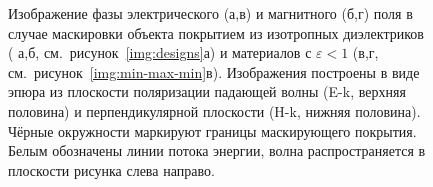\begin{figure}[p]
  \begin{minipage}[ht]{0.495\linewidth}
  \end{minipage}
  \hfill
  \begin{minipage}[ht]{0.495\linewidth}
  \end{minipage}
  \begin{minipage}[ht]{0.495\linewidth}
  \end{minipage}
  \hfill
  \begin{minipage}[ht]{0.495\linewidth}
  \end{minipage}

  \caption{Изображение фазы электрического (а,в) и магнитного (б,г)
    поля в случае маскировки объекта покрытием из изотропных
    диэлектриков ( а,б, см.~рисунок~\ref{img:designs}а) и материалов
    с ${\varepsilon <1}$ (в,г,
    см.~рисунок~\ref{img:min-max-min}в). Изображения построены в
    виде эпюра из плоскости поляризации падающей волны (E-k, верхняя
    половина) и перпендикулярной плоскости (H-k, нижняя половина). Чёрные
    окружности маркируют границы маскирующего покрытия. Белым
    обозначены линии потока энергии, волна распространяется в
    плоскости рисунка слева направо.}
  \label{img:field-phase}
\end{figure}

